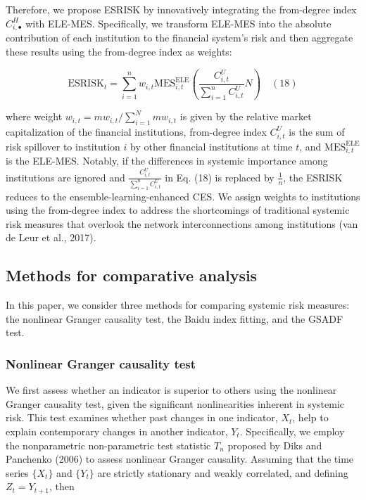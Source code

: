\documentclass[12pt,a4paper]{article}
\begin{document}
    Therefore, we propose ESRISK by innovatively integrating the from-degree index $C_{i,\bullet}^{H}$ with ELE-MES. Specifically, we transform ELE-MES into the absolute contribution of each institution to the financial system's risk and then aggregate these results using the from-degree index as weights:

    \[
    \mathrm{ESRISK}_t = \sum_{i=1}^{n}w_{i,t}\mathrm{MES}_{i,t}^{\mathrm{ELE}}\left(\frac{C_{i,t}^{U}}{\sum_{i=1}^{n}C_{i,t}^{U}} N\right) \quad (18)
    \]

    where weight $w_{i,t} = mw_{i,t} / \sum_{i=1}^{N}mw_{i,t}$ is given by the relative market capitalization of the financial institutions, from-degree index $C_{i,t}^{U}$ is the sum of risk spillover to institution $i$ by other financial institutions at time $t$, and $\mathrm{MES}_{i,t}^{\mathrm{ELE}}$ is the ELE-MES. Notably, if the differences in systemic importance among institutions are ignored and $\frac{C_{i,t}^{U}}{\sum_{i=1}^{n}C_{i,t}^{U}}$ in Eq. (18) is replaced by $\frac{1}{n}$, the ESRISK reduces to the ensemble-learning-enhanced CES. We assign weights to institutions using the from-degree index to address the shortcomings of traditional systemic risk measures that overlook the network interconnections among institutions (van de Leur et al., 2017).

    \subsection{Methods for comparative analysis}

    In this paper, we consider three methods for comparing systemic risk measures: the nonlinear Granger causality test, the Baidu index fitting, and the GSADF test.

    \subsubsection{Nonlinear Granger causality test}

    We first assess whether an indicator is superior to others using the nonlinear Granger causality test, given the significant nonlinearities inherent in systemic risk. This test examines whether past changes in one indicator, $X_{t}$, help to explain contemporary changes in another indicator, $Y_{t}$. Specifically, we employ the nonparametric non-parametric test statistic $T_{n}$ proposed by Diks and Panchenko (2006) to assess nonlinear Granger causality. Assuming that the time series $\{X_{t}\}$ and $\{Y_{t}\}$ are strictly stationary and weakly correlated, and defining $Z_{t} = Y_{t+1}$, then
\end{document}
